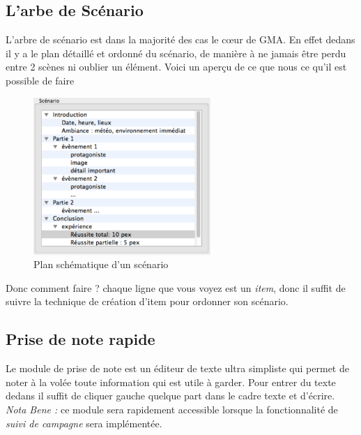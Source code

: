 \documentclass[12pt]{article}
\begin{document}
\subsection{L'arbe de Scénario}\label{scenario}
L'arbre de scénario est dans la majorité des cas le cœur de GMA. En effet dedans il y a le plan détaillé et ordonné du scénario, de manière à ne jamais être perdu entre 2 scènes ni oublier un élément.
Voici un aperçu de ce que nous ce qu'il est possible de faire
\begin{figure}[h]
    \includegraphics[width=0.6\textwidth]{scenario_type}
    \caption{Plan schématique d'un scénario}
\end{figure}
Donc comment faire ?
chaque ligne que vous voyez est un \emph{item}, donc il suffit de suivre la technique de création d'item pour ordonner son scénario.


\subsection{Prise de note rapide}
Le module de prise de note est un éditeur de texte ultra simpliste qui permet de noter à la volée toute information qui est utile à garder. Pour entrer du texte dedans il suffit de cliquer gauche quelque part dans le cadre texte et d'écrire.\\
\emph{Nota Bene :} ce module sera rapidement accessible lorsque la fonctionnalité de \emph{suivi de campagne} sera implémentée.
\end{document}
